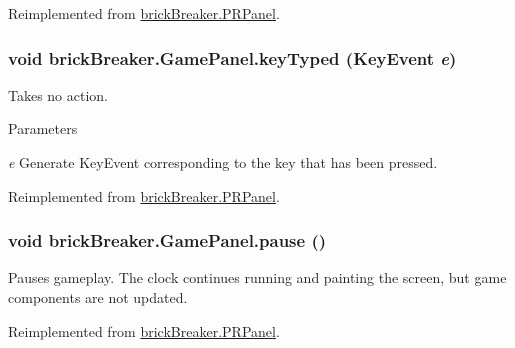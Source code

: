 Reimplemented from \hyperlink{classbrick_breaker_1_1_p_r_panel_a3485136bec68dd500b98039bd7a87e8e}{brickBreaker.PRPanel}.

\hypertarget{classbrick_breaker_1_1_game_panel_a23a455353c5904274a39f0f224cb0005}{
\subsubsection[{keyTyped}]{\setlength{\rightskip}{0pt plus 5cm}void brickBreaker.GamePanel.keyTyped (KeyEvent {\em e})}}
\label{classbrick_breaker_1_1_game_panel_a23a455353c5904274a39f0f224cb0005}
Takes no action. 
\begin{DoxyParams}{Parameters}
\item[{\em e}]Generate KeyEvent corresponding to the key that has been pressed. \end{DoxyParams}


Reimplemented from \hyperlink{classbrick_breaker_1_1_p_r_panel_a51bdf51ab7141c16101753e4180c970a}{brickBreaker.PRPanel}.

\hypertarget{classbrick_breaker_1_1_game_panel_a74382da15296d8ed9be081e4e6af72cc}{
\subsubsection[{pause}]{\setlength{\rightskip}{0pt plus 5cm}void brickBreaker.GamePanel.pause ()}}
\label{classbrick_breaker_1_1_game_panel_a74382da15296d8ed9be081e4e6af72cc}
Pauses gameplay. The clock continues running and painting the screen, but game components are not updated. 

Reimplemented from \hyperlink{classbrick_breaker_1_1_p_r_panel_a0868e501fc5599973492e6f0c53da920}{brickBreaker.PRPanel}.


